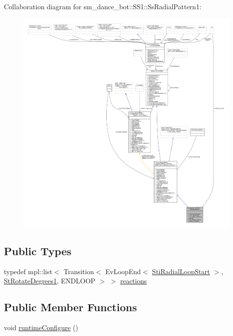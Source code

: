 Collaboration diagram for sm\+\_\+dance\+\_\+bot\+:\+:S\+S1\+:\+:Ss\+Radial\+Pattern1\+:
\nopagebreak
\begin{figure}[H]
\begin{center}
\leavevmode
\includegraphics[width=350pt]{structsm__dance__bot_1_1SS1_1_1SsRadialPattern1__coll__graph}
\end{center}
\end{figure}
\subsection*{Public Types}
\begin{DoxyCompactItemize}
\item 
typedef mpl\+::list$<$ Transition$<$ Ev\+Loop\+End$<$ \hyperlink{structsm__dance__bot_1_1radial__motion__states_1_1StiRadialLoopStart}{Sti\+Radial\+Loop\+Start} $>$, \hyperlink{structsm__dance__bot_1_1StRotateDegrees1}{St\+Rotate\+Degrees1}, E\+N\+D\+L\+O\+OP $>$ $>$ \hyperlink{structsm__dance__bot_1_1SS1_1_1SsRadialPattern1_a771bd101df407fefe77cd6932405c94a}{reactions}
\end{DoxyCompactItemize}
\subsection*{Public Member Functions}
\begin{DoxyCompactItemize}
\item 
void \hyperlink{structsm__dance__bot_1_1SS1_1_1SsRadialPattern1_a97176fd198e7bdcde482183826bec968}{runtime\+Configure} ()
\end{DoxyCompactItemize}
